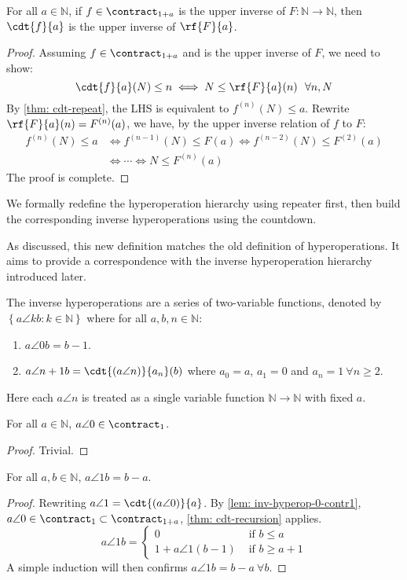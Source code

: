 \begin{thm} \label{thm: upp-inv-cdt-rf}
For all $a\in \mathbb{N}$, if $f\in \contract_{1+a}$ is the upper inverse of $F: \mathbb{N}\to \mathbb{N}$, then $\cdt{f}{a}$ is the upper inverse of $\rf{F}{a}$.
\end{thm}
\begin{proof}
Assuming $f\in \contract_{1+a}$ and is the upper inverse of $F$, we need to show:
$$ \cdt{f}{a}(N) \le n \iff N \le \rf{F}{a}(n) \ \ \forall n, N $$
By \cref{thm: cdt-repeat}, the LHS is equivalent to $f^{(n)}(N)\le a$. Rewrite $\rf{F}{a}(n) = F^{(n)}(a)$, we have, by the upper inverse relation of $f$ to $F$:
$$ \begin{aligned}
f^{(n)}(N) \le a & \iff f^{(n-1)}(N) \le F(a) \iff f^{(n-2)}(N) \le F^{(2)}(a) \\
 & \iff \cdots \iff N \le F^{(n)}(a) 
\end{aligned}$$
The proof is complete.
\end{proof}

We formally redefine the hyperoperation hierarchy using repeater first, then build the corresponding inverse hyperoperations using the countdown.


As discussed, this new definition matches the old definition of hyperoperations. It aims to provide a correspondence with the inverse hyperoperation hierarchy introduced later.

\begin{defn}
The inverse hyperoperations are a series of two-variable functions, denoted by $\left\{a\angle{k}b : k\in \mathbb{N}\right\}$ where for all $a, b, n\in \mathbb{N}$:
\begin{enumerate}
	\item $a\angle{0}b = b - 1$.
	\item $a\angle{n+1}b = \cdt{\left(a\angle{n}\right)}{a_n}(b)$ where $a_0 = a$, $a_1 = 0$ and $a_n = 1 \ \forall n\ge 2$.
\end{enumerate}
Here each $a\angle{n}$ is treated as a single variable function $\mathbb{N}\to \mathbb{N}$ with fixed $a$.
\end{defn}

\begin{lem}  \label{lem: inv-hyperop-0-contr1}
For all $a\in \mathbb{N}$, $a\angle{0}\in \contract_1$.
\end{lem}
\begin{proof}
Trivial.
\end{proof}

\begin{thm}
For all $a, b\in \mathbb{N}$, $a\angle{1}b = b - a$.
\end{thm}
\begin{proof}
Rewriting $a\angle{1} = \cdt{\left(a\angle{0}\right)}{a}$. By \cref{lem: inv-hyperop-0-contr1}, $a\angle{0} \in \contract_1 \subset \contract_{1+a}$, \cref{thm: cdt-recursion} applies.
$$ a\angle{1}b = \begin{cases}
0 & \text{ if } b\le a \\ 1 + a\angle{1}(b - 1) & \text{ if } b\ge a+1
\end{cases} $$
A simple induction will then confirms $a\angle{1}b = b - a \ \forall b$.
\end{proof}

